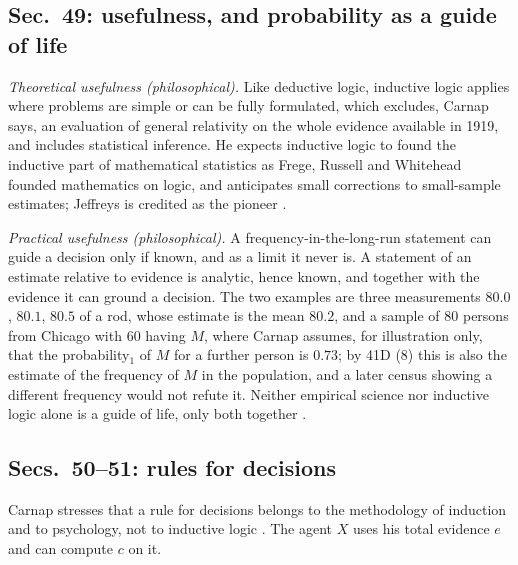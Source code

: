 \subsection*{Sec.~49: usefulness, and probability as a guide of life}

\emph{Theoretical usefulness (philosophical).} Like deductive logic,
inductive logic applies where problems are simple or can be fully
formulated, which excludes, Carnap says, an evaluation of general
relativity on the whole evidence available in 1919, and includes
statistical inference. He expects inductive logic to found the
inductive part of mathematical statistics as Frege, Russell and
Whitehead founded mathematics on logic, and anticipates small
corrections to small-sample estimates; Jeffreys is credited as the
pioneer \cite[sec.~49A, pp.~241--246]{Carnap1950Probability}.

\emph{Practical usefulness (philosophical).} A frequency-in-the-long-run
statement can guide a decision only if known, and as a limit it never is.
A statement of an estimate relative to evidence is analytic, hence known,
and together with the evidence it can ground a decision. The two
examples are three measurements \(80.0\), \(80.1\), \(80.5\) of a rod,
whose estimate is the mean \(80.2\), and a sample of \(80\) persons
from Chicago with \(60\) having \(M\), where Carnap assumes, for
illustration only, that the probability\(_1\) of \(M\) for a further
person is \(0.73\); by 41D (8) this is also the estimate of the
frequency of \(M\) in the population, and a later census showing a
different frequency would not refute it. Neither empirical science nor
inductive logic alone is a guide of life, only both together
\cite[sec.~49B, pp.~246--252]{Carnap1950Probability}.

\subsection*{Secs.~50--51: rules for decisions}

Carnap stresses that a rule for decisions belongs to the methodology of
induction and to psychology, not to inductive logic
\cite[sec.~50A, pp.~252--254]{Carnap1950Probability}. The agent \(X\)
uses his total evidence \(e\) and can compute \(c\) on it.

